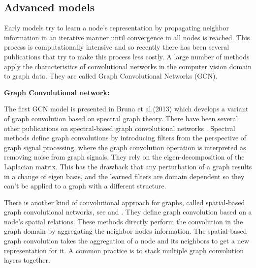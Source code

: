 \subsection{Advanced models} 





Early models try to learn a node's representation by propagating neighbor information in an iterative manner until convergence in all nodes is reached. This process is computationally intensive and so recently there has been several publications that try to make this process less costly. A large number of methods apply the characteristics of convolutional networks in the computer vision domain to graph data. They are called Graph Convolutional Networks (GCN).

\textbf{Graph Convolutional network:}






The first GCN model is presented in Bruna et al.(2013) \cite{bruna} which develops a variant of graph convolution based on spectral graph theory. There have been several other publications on spectral-based graph convolutional networks \cite{defferrard2016convolutional}.  Spectral methods define graph convolutions by introducing filters from the perspective of graph signal processing, where the graph convolution operation is interpreted as removing noise from graph signals. They rely on the eigen-decomposition of the Laplacian matrix. This has the drawback that any perturbation  of a graph results in a change of eigen basis, and the learned filters are domain dependent so they can't be applied to a graph with a different structure. 


There is another kind of convolutional approach for graphs, called spatial-based graph convolutional networks, see \cite{graphsage} and \cite{geometricdl}. They define graph convolution based on a node's spatial relations. These methods directly perform the convolution in the graph domain by aggregating the neighbor nodes  information. The spatial-based graph convolution takes the aggregation of a node and its neighbors to get a new representation for it. A common practice is to stack multiple graph convolution layers together.



